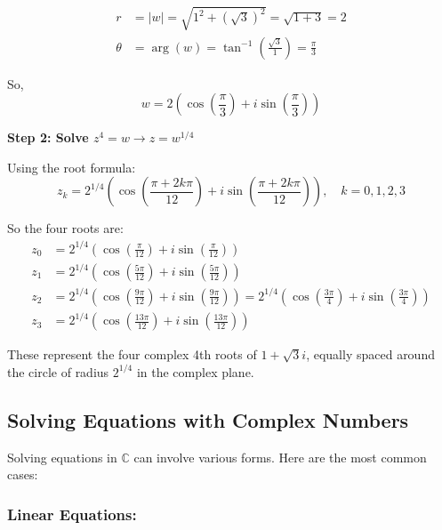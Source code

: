 \begin{align*}
	r      & = |w| = \sqrt{1^2 + (\sqrt{3})^2} = \sqrt{1 + 3} = 2                    \\
	\theta & = \arg(w) = \tan^{-1} \left( \frac{\sqrt{3}}{1} \right) = \frac{\pi}{3}
\end{align*}

So,
\[
	w = 2 \left( \cos\left( \frac{\pi}{3} \right) + i \sin\left( \frac{\pi}{3} \right) \right)
\]

\textbf{Step 2: Solve \( z^4 = w \to z = w^{1/4} \)}

Using the root formula:
\[
	z_k = 2^{1/4} \left( \cos\left( \frac{\pi + 2k\pi}{12} \right) + i \sin\left( \frac{\pi + 2k\pi}{12} \right) \right), \quad k = 0, 1, 2, 3
\]

So the four roots are:
\begin{align*}
	z_0 & = 2^{1/4} \left( \cos\left( \frac{\pi}{12} \right) + i \sin\left( \frac{\pi}{12} \right) \right)                                                                                                    \\
	z_1 & = 2^{1/4} \left( \cos\left( \frac{5\pi}{12} \right) + i \sin\left( \frac{5\pi}{12} \right) \right)                                                                                                  \\
	z_2 & = 2^{1/4} \left( \cos\left( \frac{9\pi}{12} \right) + i \sin\left( \frac{9\pi}{12} \right) \right) = 2^{1/4} \left( \cos\left( \frac{3\pi}{4} \right) + i \sin\left( \frac{3\pi}{4} \right) \right) \\
	z_3 & = 2^{1/4} \left( \cos\left( \frac{13\pi}{12} \right) + i \sin\left( \frac{13\pi}{12} \right) \right)
\end{align*}

These represent the four complex 4th roots of \( 1 + \sqrt{3}i \), equally spaced around the circle of radius \( 2^{1/4} \) in the complex plane.

\subsection{Solving Equations with Complex Numbers}

Solving equations in \( \mathbb{C} \) can involve various forms. Here are the most common cases:

\subsubsection*{Linear Equations:}

